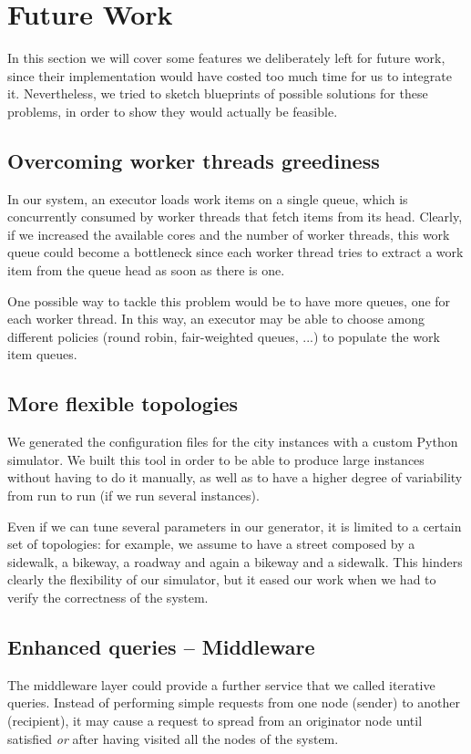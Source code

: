 \section{Future Work}
In this section we will cover some features we deliberately left for future
work, since their implementation would have costed too much time for us to
integrate it.
Nevertheless, we tried to sketch blueprints of possible solutions for these
problems, in order to show they would actually be feasible.

\subsection{Overcoming worker threads greediness}
In our system, an executor loads work items on a single queue, which is
concurrently consumed by worker threads that fetch items from its head.
Clearly, if we increased the available cores and the number of worker threads,
this work queue could become a bottleneck since each worker thread tries to
extract a work item from the queue head as soon as there is one.

One possible way to tackle this problem would be to have more queues, one for
each worker thread. In this way, an executor may be able to choose among
different policies (round robin, fair-weighted queues, ...) to populate the
work item queues.

\subsection{More flexible topologies}
We generated the configuration files for the city instances with a custom
Python simulator. We built this tool in order to be able to produce large
instances without having to do it manually, as well as to have a higher degree
of variability from run to run (if we run several instances).

Even if we can tune several parameters in our generator, it is limited to a
certain set of topologies: for example, we assume to have a street composed by
a sidewalk, a bikeway, a roadway and again a bikeway and a sidewalk.
This hinders clearly the flexibility of our simulator, but it eased our work
when we had to verify the correctness of the system.

\subsection{Enhanced queries -- Middleware}\label{sec:future-iterative-rpc}
The middleware layer could provide a further service that we called iterative
queries. Instead of performing simple requests from one node (sender) to
another (recipient), it may cause a request to spread from an originator node
until satisfied \textit{or} after having visited all the nodes of the system.

